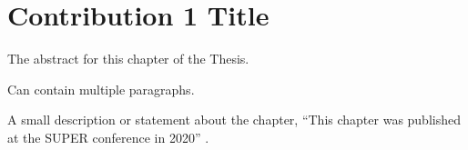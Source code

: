 \chapter{Contribution 1 Title}
\glsresetall
\label{chap:3-contribution_1}

\begin{cabstract}
The abstract for this chapter of the Thesis.

Can contain multiple paragraphs.

\blindtext
\end{cabstract}

A small description or statement about the chapter, \eg ``This chapter was published at the SUPER conference in 2020'' \parencite{robinson2020thesis}. 


